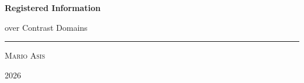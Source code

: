\begin{titlepage}
\thispagestyle{empty}
\centering
\vspace*{0.16\textheight}
{\Huge\bfseries Registered Information\par}
\vspace{0.6em}
{\LARGE over Contrast Domains\par}
\vspace{2.2em}
\rule{0.4\textwidth}{0.4pt}\par
\vspace{2.2em}
{\large\scshape Mario Asis\par}
\vfill
{\normalsize 2026\par}
\vspace*{0.04\textheight}
\end{titlepage}
